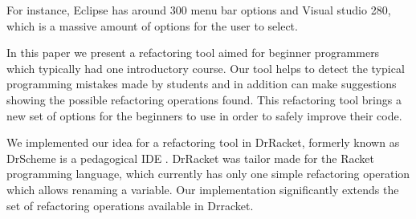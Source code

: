 For instance, Eclipse has around 300 menu bar options and Visual studio 280, which is a massive amount
of options for the user to select.

In this paper we present a refactoring tool aimed for beginner programmers which typically
had one introductory course.
Our tool helps to detect the typical programming mistakes made by students and in
addition can make suggestions showing the possible refactoring operations found.
This refactoring tool brings a new set of options for the beginners to use
in order to safely improve their code.


We implemented our idea for a refactoring tool in DrRacket, formerly known as
DrScheme is a pedagogical IDE \cite{drscheme}\cite{drscheme_pegadogy}.
DrRacket was tailor made for the Racket programming language, which currently
has only one simple refactoring operation which allows renaming a variable.
Our implementation significantly extends the set of refactoring operations available
in Drracket.
